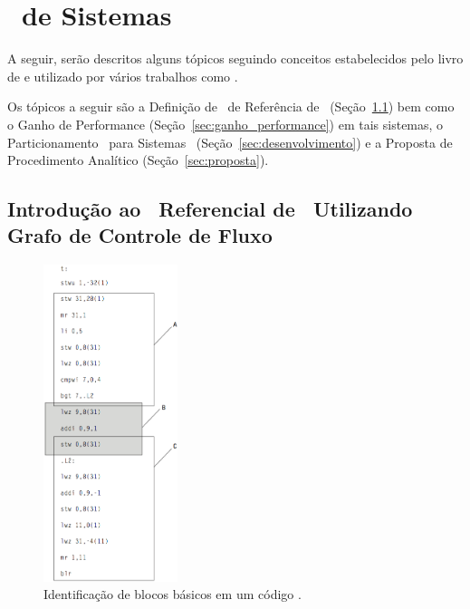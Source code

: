\chapter{\Design\ de Sistemas \Wearable} \label{chap:design}

   A seguir, serão descritos alguns tópicos seguindo conceitos estabelecidos pelo livro de \citet{Sass2010} e utilizado por vários trabalhos como \citet{Arato2003, Arato2005, Mann2007, Hassine2017}.

   Os tópicos a seguir são a Definição de \Design\ de Referência de \Software\ (Seção~\ref{sec:GCF}) bem como o Ganho de Performance (Seção~\ref{sec:ganho_performance}) em tais sistemas, o Particionamento \HS\ para Sistemas \Wearables\  (Seção~\ref{sec:desenvolvimento}) e a Proposta de Procedimento Analítico (Seção~\ref{sec:proposta}).

   \section{Introdução ao \Design\ Referencial de \Software\ Utilizando Grafo de Controle de Fluxo} \label{sec:GCF}

      \begin{figure}
      	\centering
      	\includegraphics[width=0.35\textwidth]{img/f3-5.png}
      	\caption{Identificação de blocos básicos em um código \assembly.}
      	\label{fig:blocos_basicos}
      \end{figure}

